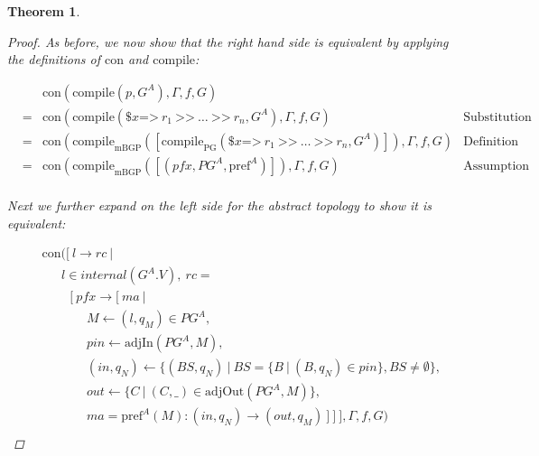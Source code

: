 \documentclass[twocolumn, openany]{sig-alternate-10pt}
\newcommand{\Prefer}{\texttt{>>}}
\newcommand{\Path}{\texttt{=>}}
\newcommand{\Con}{\mathrm{con}}
\newcommand{\CompilePg}{\ensuremath{\mathrm{compile}_\mathrm{PG}}}
\newcommand{\CompileMbgp}{\ensuremath{\mathrm{compile}_\mathrm{mBGP}}}
\newcommand{\Compile}{\ensuremath{\mathrm{compile}}}
\newcommand{\Pref}{\ensuremath{\mathrm{pref}}}
\newtheorem{thm}{Theorem}
\begin{document}
\begin{thm}
\begin{proof}
    As before, we now show that the right hand side is equivalent by applying the definitions of $\Con$ and $\Compile$:

        \[
    \begin{array}{llll}
      & & \Con(\Compile(p,G^A),\Gamma,f,G) \\
      &=& \Con(\Compile(\$x \Path~ r_1 ~\Prefer~ \ldots ~\Prefer~ r_n,G^A),\Gamma,f,G)
            & \text{Substitution} \\
      &=& \Con(\CompileMbgp([\CompilePg(\$x \Path~ r_1 ~\Prefer~ \ldots ~\Prefer~ r_n,G^A)]),\Gamma,f,G)
            & \text{Definition of Compile} \\
      &=& \Con(\CompileMbgp([(pfx,PG^A,\Pref^A)]),\Gamma,f,G)
            & \text{Assumption}\\
    \end{array}
    \]



  Next we further expand on the left side for the abstract topology to show it is equivalent:

  \[ \begin{array}{l}
     ~~~~~ \Con([~ l \rightarrow rc ~\vert~ \\
     ~~~~~~~~~~~~ l \in internal(G^A.V), ~rc =  \\
     ~~~~~~~~~~~~~~~ [~ pfx \rightarrow [~ ma ~\vert~ \\
     ~~~~~~~~~~~~~~~~~~~~~ M \leftarrow (l,q_M) \in PG^A, \\
     ~~~~~~~~~~~~~~~~~~~~~ pin \leftarrow \text{adjIn}(PG^A,M), \\
     ~~~~~~~~~~~~~~~~~~~~~ (in,q_N) \leftarrow \{ (BS,q_N) ~\vert~ BS=\{B ~\vert~ (B,q_N) \in pin \}, BS \neq \emptyset \}, \\
     ~~~~~~~~~~~~~~~~~~~~~ out \leftarrow \{ C ~\vert~ (C,\_) \in \text{adjOut}(PG^A,M) \}, \\
     ~~~~~~~~~~~~~~~~~~~~~ ma = \Pref^A(M) : (in,q_N) \rightarrow (out,q_M) ~] ~] ~], \Gamma, f, G) \\
  \end{array} \]%





  \end{proof}

\end{thm}
\end{document}
